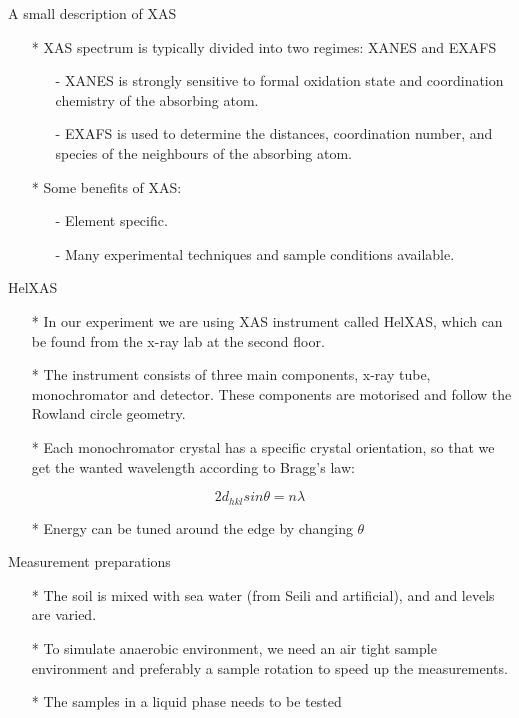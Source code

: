 \documentclass{beamer}
\begin{document}
  \begin{frame}{A small description of XAS}
  \begin{itemize}
    \item[*] XAS spectrum is typically divided into two regimes: XANES and EXAFS
    \begin{itemize}
      \item[-] XANES is strongly sensitive to formal oxidation state and coordination chemistry of the absorbing atom.
      \item[-] EXAFS is used to determine the distances, coordination number, and species of the neighbours of the absorbing atom.  
    \end{itemize}
    \item[*] Some benefits of XAS:
    \begin{itemize}
      \item[-] Element specific.
      \item[-] Many experimental techniques and sample conditions available.
    \end{itemize}
  \end{itemize}
  \end{frame}
  
  \begin{frame}{HelXAS}
  \begin{itemize}
    \item[*] In our experiment we are using XAS instrument called HelXAS, which can be found from the x-ray lab at the second floor. 
    \item[*] The instrument consists of three main components, x-ray tube, monochromator and detector. These components are motorised and follow the Rowland circle geometry.
    \item[*] Each monochromator crystal has a specific crystal orientation, so that we get the wanted wavelength according to Bragg's law:   
  \end{itemize}
  \begin{equation}
  2d_{hkl}sin\theta=n\lambda
  \end{equation}
  \begin{itemize}
    \item[*] Energy can be tuned around the edge by changing $\theta$
  \end{itemize}
  \end{frame}
  \begin{frame}{Measurement preparations}
  \begin{itemize}
    \item[*] The soil is mixed with sea water (from Seili and artificial), and  and  levels are varied.
    \item[*] To simulate anaerobic environment, we need an air tight sample environment and preferably a sample rotation to speed up the measurements.
    \item[*] The samples in a liquid phase needs to be tested
  \end{itemize}
  \end{frame}
\end{document}
